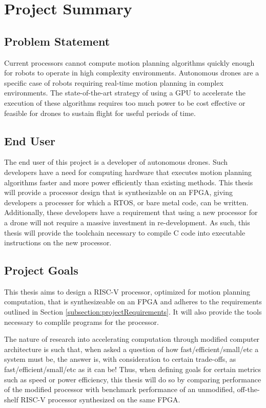 
\section{Project Summary}

\subsection{Problem Statement}
Current processors cannot compute motion planning algorithms quickly enough for robots to operate in high complexity environments. Autonomous drones are a specific case of robots requiring real-time motion planning in complex environments. The state-of-the-art strategy of using a \ac{GPU} to accelerate the execution of these algorithms requires too much power to be cost effective or feasible for drones to sustain flight for useful periods of time.

\subsection{End User}
The end user of this project is a developer of autonomous drones. Such developers have a need for computing hardware that executes motion planning algorithms faster and more power efficiently than existing methods. This thesis will provide a processor design that is synthesizable on an \ac{FPGA}, giving developers a processer for which a \ac{RTOS}, or bare metal code, can be written. 
Additionally, these developers have a requirement that using a new processor for a drone will not require a massive investment in re-development. As such, this thesis will provide the toolchain necessary to compile C code into executable instructions on the new processor.

\subsection{Project Goals} \label{subsection:projectGoals}
This thesis aims to design a RISC-V processor, optimized for motion planning computation, that is synthesizeable on an \ac{FPGA} and adheres to the requirements outlined in Section \ref{subsection:projectRequirements}. It will also provide the tools necessary to complile programs for the processor. 

The nature of research into accelerating computation through modified computer architecture is such that, when asked a question of how fast/efficient/small/etc a system must be, the answer is, with consideration to certain trade-offs, as fast/efficient/small/etc as it can be! Thus, when defining goals for certain metrics such as speed or power efficiency, this thesis will do so by comparing performance of the modified processor with benchmark performance of an unmodified, off-the-shelf RISC-V processor synthesized on the same \ac{FPGA}.

